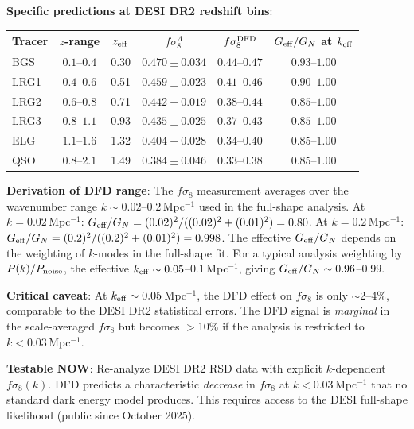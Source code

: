 \documentclass[11pt,a4paper]{article}
\newcommand{\Geff}{G_{\rm eff}}
\begin{document}
\textbf{Specific predictions at DESI DR2 redshift bins}:

\begin{center}
\begin{tabular}{lccccc}
\toprule
\textbf{Tracer} & \textbf{$z$-range} & \textbf{$z_{\rm eff}$}
  & \textbf{$f\sigma_8^{\Lambda}$} & \textbf{$f\sigma_8^{\rm DFD}$}
  & \textbf{$\Geff/G_N$ at $k_{\rm eff}$} \\
\midrule
BGS  & $0.1$--$0.4$ & 0.30 & $0.470 \pm 0.034$ & $0.44$--$0.47$ & $0.93$--$1.00$ \\
LRG1 & $0.4$--$0.6$ & 0.51 & $0.459 \pm 0.023$ & $0.41$--$0.46$ & $0.90$--$1.00$ \\
LRG2 & $0.6$--$0.8$ & 0.71 & $0.442 \pm 0.019$ & $0.38$--$0.44$ & $0.85$--$1.00$ \\
LRG3 & $0.8$--$1.1$ & 0.93 & $0.435 \pm 0.025$ & $0.37$--$0.43$ & $0.85$--$1.00$ \\
ELG  & $1.1$--$1.6$ & 1.32 & $0.404 \pm 0.028$ & $0.34$--$0.40$ & $0.85$--$1.00$ \\
QSO  & $0.8$--$2.1$ & 1.49 & $0.384 \pm 0.046$ & $0.33$--$0.38$ & $0.85$--$1.00$ \\
\bottomrule
\end{tabular}
\end{center}

\textbf{Derivation of DFD range}: The $f\sigma_8$ measurement
averages over the wavenumber range $k \sim 0.02$--$0.2$\,Mpc$^{-1}$
used in the full-shape analysis. At $k = 0.02$\,Mpc$^{-1}$:
$\Geff/G_N = (0.02)^2/((0.02)^2 + (0.01)^2) = 0.80$.
At $k = 0.2$\,Mpc$^{-1}$:
$\Geff/G_N = (0.2)^2/((0.2)^2 + (0.01)^2) = 0.998$.
The effective $\Geff/G_N$ depends on the weighting of $k$-modes
in the full-shape fit. For a typical analysis weighting by $P(k)/P_{\rm noise}$,
the effective $k_{\rm eff} \sim 0.05$--$0.1$\,Mpc$^{-1}$, giving
$\Geff/G_N \sim 0.96$--$0.99$.

\textbf{Critical caveat}: At $k_{\rm eff} \sim 0.05$\,Mpc$^{-1}$,
the DFD effect on $f\sigma_8$ is only $\sim$2--4\%, comparable to
the DESI DR2 statistical errors. The DFD signal is \emph{marginal}
in the scale-averaged $f\sigma_8$ but becomes $>$10\% if the analysis
is restricted to $k < 0.03$\,Mpc$^{-1}$.

\textbf{Testable NOW}: Re-analyze DESI DR2 RSD data with explicit
$k$-dependent $f\sigma_8(k)$. DFD predicts a characteristic
\emph{decrease} in $f\sigma_8$ at $k < 0.03$\,Mpc$^{-1}$ that
no standard dark energy model produces. This requires access to
the DESI full-shape likelihood (public since October 2025).
\end{document}

